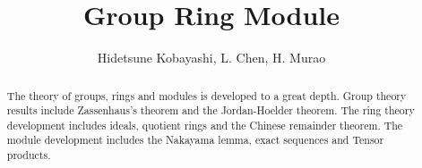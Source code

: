 \documentclass[11pt,a4paper]{report}
\begin{document}
\title{Group Ring Module}
\author{Hidetsune Kobayashi, L. Chen, H. Murao}
\maketitle

\begin{abstract}
The theory of groups, rings and modules is developed to a great depth. Group
theory results include Zassenhaus's theorem and the Jordan-Hoelder
theorem. The ring theory development includes ideals, quotient rings and the
Chinese remainder theorem. The module development includes the Nakayama lemma,
exact sequences and Tensor products.
\end{abstract}

\tableofcontents


\end{document}
